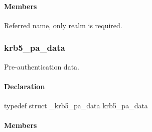 \documentclass[letterpaper,10pt,english]{sphinxmanual}
\begin{document}
\paragraph{Members}
\label{appdev/refs/types/krb5_pa_svr_referral_data:members}

\begin{fulllineitems}
\label{appdev/refs/types/krb5_pa_svr_referral_data:c.krb5_pa_svr_referral_data.principal}
Referred name, only realm is required.

\end{fulllineitems}



\subsubsection{krb5\_pa\_data}
\label{appdev/refs/types/krb5_pa_data:krb5-pa-data}\label{appdev/refs/types/krb5_pa_data:krb5-pa-data-struct}\label{appdev/refs/types/krb5_pa_data::doc}

\begin{fulllineitems}
\label{appdev/refs/types/krb5_pa_data:c.krb5_pa_data}
\end{fulllineitems}


Pre-authentication data.


\paragraph{Declaration}
\label{appdev/refs/types/krb5_pa_data:declaration}
typedef struct \_krb5\_pa\_data  krb5\_pa\_data


\paragraph{Members}
\label{appdev/refs/types/krb5_pa_data:members}

\begin{fulllineitems}
\label{appdev/refs/types/krb5_pa_data:c.krb5_pa_data.magic}
\end{fulllineitems}
\end{document}
